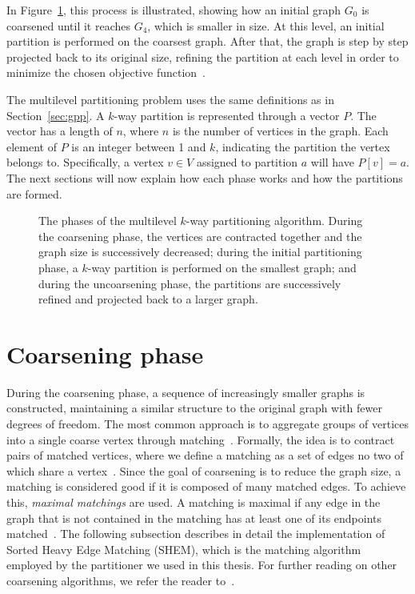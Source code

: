 In Figure~\ref{fig:multilevel-overview}, this process is illustrated, showing how an initial graph $G_0$ is coarsened until it reaches $G_4$, which is smaller in size. At this level, an initial partition is performed on the coarsest graph. After that, the graph is step by step projected back to its original size, refining the partition at each level in order to minimize the chosen objective function~\cite{KarypisGeorge1999PMkP}.

The multilevel partitioning problem uses the same definitions as in Section~\ref{sec:gpp}. A $k$-way partition is represented through a vector $P$. The vector has a length of $n$, where $n$ is the number of vertices in the graph. Each element of $P$ is an integer between 1 and $k$, indicating the partition the vertex belongs to. Specifically, a vertex $v \in V$ assigned to partition $a$ will have $P[v] = a$. The next sections will now explain how each phase works and how the partitions are formed.
\begin{figure}[h]
	\centering
	\scalebox{0.65}{}
	\caption{The phases of the multilevel $k$-way partitioning algorithm. During the coarsening phase, the vertices are contracted together and the graph size is successively decreased; during the initial partitioning phase, a $k$-way partition is performed on the smallest graph; and during the uncoarsening phase, the partitions are successively refined and projected back to a larger graph.}
	\label{fig:multilevel-overview}
\end{figure}

\section{Coarsening phase} \label{sec:coarsening}
During the coarsening phase, a sequence of increasingly smaller graphs is constructed, maintaining a similar structure to the original graph with fewer degrees of freedom. The most common approach is to aggregate groups of vertices into a single coarse vertex through matching~\cite{buluc_recent_2016, KarypisGeorge1998AFaH}. Formally, the idea is to contract pairs of matched vertices, where we define a matching as a set of edges no two of which share a vertex~\cite{buluc_recent_2016, KarypisGeorge1998AFaH}. Since the goal of coarsening is to reduce the graph size, a matching is considered good if it is composed of many matched edges. To achieve this, \textit{maximal matchings} are used. A matching is maximal if any edge in the graph that is not contained in the matching has at least one of its endpoints matched~\cite{KarypisGeorge1998AFaH}. The following subsection describes in detail the implementation of Sorted Heavy Edge Matching (SHEM), which is the matching algorithm employed by the partitioner we used in this thesis. For further reading on other coarsening algorithms, we refer the reader to~\cite{buluc_recent_2016, KarypisGeorge1998AFaH}. 

